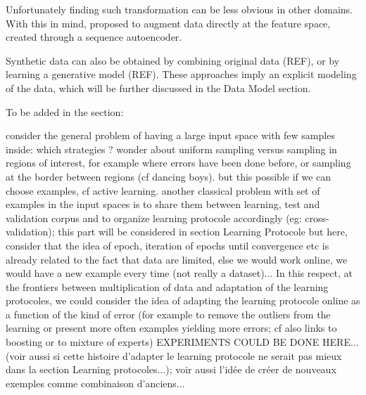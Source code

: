 \documentclass[twocolumn]{article}
\begin{document}
Unfortunately finding such transformation can be less obvious in other domains. With this in mind, \cite{Devries2017Dataset} proposed to augment data directly at the feature space, created through a sequence autoencoder.




Synthetic data can also be obtained by combining original data (REF), or by learning a generative model (REF). These approaches imply an explicit modeling of the data, which will be further discussed in the Data Model section.


To be added in the section:
\begin{outline}
\1 consider the general problem of having a large input space with few samples inside: which strategies ? 
\2 wonder about uniform sampling versus sampling in regions of interest, for example where errors have been done before, or sampling at the border between regions (cf dancing boys). but this possible if we can choose examples, cf active learning.
\1 another classical problem with set of examples in the input spaces is to share them between learning, test and validation corpus and to organize learning protocole accordingly (eg: cross-validation); this part will be considered in section Learning Protocole but here,  consider that the idea of epoch, iteration of epochs until convergence etc is already related to the fact that data are limited, else we would work online, we would have a new example every time (not really a dataset)... In this respect, at the frontiers between multiplication of data and adaptation of the learning protocoles, we could consider the idea of adapting the learning protocole online as a function of the kind of error (for example to remove the outliers from the learning or present more often examples yielding more errors; cf also links to boosting or to mixture of experts) EXPERIMENTS COULD BE DONE HERE... (voir aussi si cette histoire d'adapter le learning protocole ne serait pas mieux dans la section Learning protocoles...); voir aussi l'idée de créer de nouveaux exemples comme combinaison d'anciens...

\end{outline}
\end{document}
